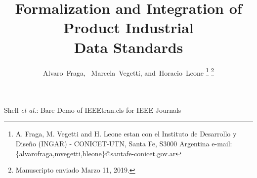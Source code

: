 \documentclass[journal]{IEEEtran}
\begin{document}
%
\title{Formalization and Integration of Product Industrial \\ Data Standards}
%
%
%

\author{Alvaro~Fraga,~
        Marcela~Vegetti,
        and~Horacio~Leone%
\thanks{A. Fraga, M. Vegetti and H. Leone estan con el Instituto de Desarrollo y Dise\~no (INGAR) - CONICET-UTN, Santa Fe, S3000 Argentina   e-mail: \{alvarofraga,mvegetti,hleone\}@santafe-conicet.gov.ar }
\thanks{Manuscripto enviado Marzo 11, 2019.}}

% 
%



%
{Shell \MakeLowercase{\textit{et al.}}: Bare Demo of IEEEtran.cls for IEEE Journals}
% 
\end{document}
